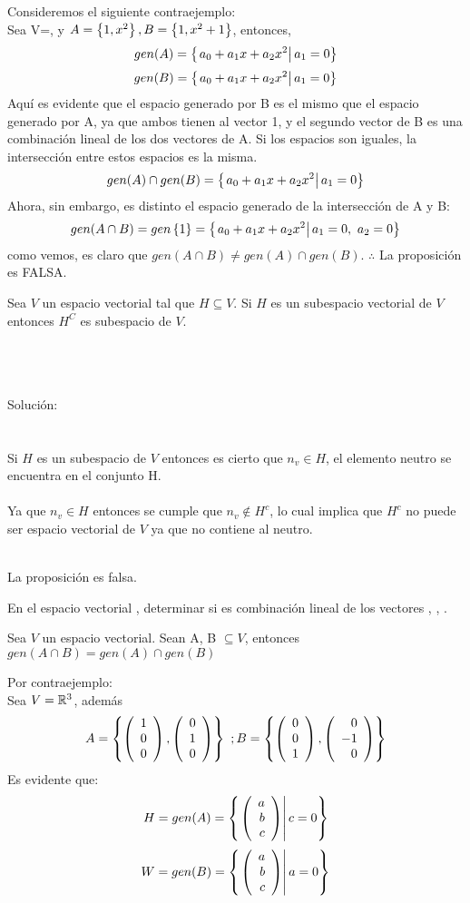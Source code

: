 \begin{enumerate}
Consideremos el siguiente contraejemplo:~\\
Sea V=\pdos, y $A= \left\{1,x^2 \right\} , B= \left\{1,x^2+1 \right\} $, entonces,
\[gen(A)=\left\{ \left. a_0+a_1x+a_2x^2\right| a_1=0 \right\}\]
\[gen(B)=\left\{ \left. a_0+a_1x+a_2x^2\right| a_1=0 \right\}\]
Aqu\'i es evidente que el espacio generado por B es el mismo que el espacio generado por A, ya que ambos tienen al vector 1, y el segundo vector de B es una combinaci\'on lineal de los dos vectores de A.
Si los espacios son iguales, la intersecci\'on entre estos espacios es la misma.
\[gen(A)\cap gen(B)=\left\{ \left. a_0+a_1x+a_2x^2\right| a_1=0 \right\}\]
Ahora, sin embargo, es distinto el espacio generado de la intersecci\'on de A y B:
\[gen(A\cap B)=gen \left\{1 \right\} =\left\{ \left. a_0+a_1x+a_2x^2\right| a_1=0,\ a_2=0 \right\}\]
como vemos, es claro que $gen(A\cap B)\neq gen(A)\cap gen(B)$. $\therefore$ La proposici\'on es FALSA.

\newpage
\begin{prop}


Sea $V$ un espacio vectorial tal que $H\subseteq V$. Si $H$ es un subespacio vectorial de $V$ entonces $H^C$ es subespacio de $V$.

\end{prop}
~\\~\\~\\
Solución:
~\\
~\\~\\
Si $H$ es un subespacio de $V$ entonces es cierto que $n_v \in H$, el elemento neutro se encuentra en el conjunto H.~\\
~\\
Ya que $n_v \in H$ entonces se cumple que $n_v \notin H^c$, lo cual implica que $H^c$ no puede ser espacio vectorial de $V$ ya que no contiene al neutro.
 
~\\
La proposición es falsa.

\newpage
\newpage


\begin{prob}[]
En el espacio vectorial \mdosxdos, determinar si 
 es combinaci\'on lineal de los vectores 
, , .
\end{prob}

\newpage

\begin{prop}
Sea $V$ un espacio vectorial. Sean A, B $\subseteq V$, entonces $gen(A\cap B)=gen(A)\cap gen(B)$
\end{prop}
\sol
Por contraejemplo:
~\\
Sea $V=\mathbb{R}^3$, además~\\
\[A=\left\lbrace \left( \begin{array}{r} 1\\ 0\\ 0 \end{array} \right) , \left( \begin{array}{r} 0\\ 1\\ 0 \end{array} \right)  \right\rbrace\  ;  B=\left\lbrace \left( \begin{array}{r} 0\\ 0\\ 1 \end{array} \right) , \left( \begin{array}{r} 0\\ -1\\ 0 \end{array} \right)  \right\rbrace\]
Es evidente que:~\\
\[H=gen(A)=\left\{ \left. \left( \begin{array}{r} a\\ b\\ c \end{array} \right) \right| c=0 \right\}\]
\[W=gen(B)=\left\{ \left. \left( \begin{array}{r} a\\ b\\ c \end{array} \right) \right| a=0 \right\}\]



\end{enumerate}
